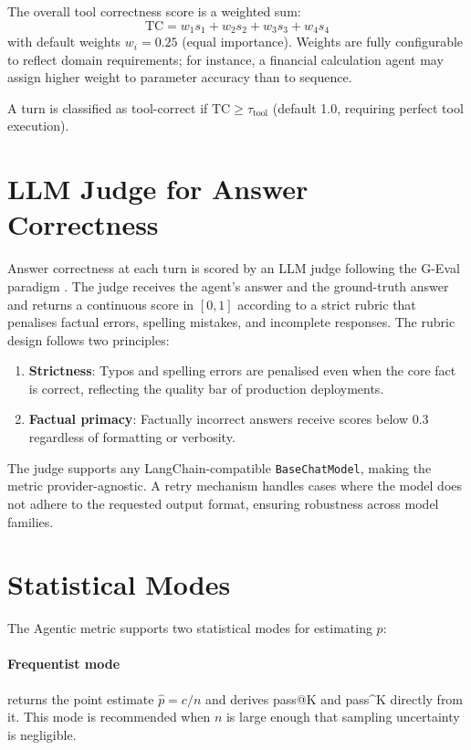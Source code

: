 \documentclass[11pt,a4paper]{article}
\begin{document}
The overall tool correctness score is a weighted sum:
\[
    \text{TC} = w_1 s_1 + w_2 s_2 + w_3 s_3 + w_4 s_4
\]
with default weights $w_i = 0.25$ (equal importance). Weights are fully
configurable to reflect domain requirements; for instance, a financial
calculation agent may assign higher weight to parameter accuracy than to
sequence.

A turn is classified as tool-correct if $\text{TC} \geq \tau_{\text{tool}}$
(default 1.0, requiring perfect tool execution).

\section{LLM Judge for Answer Correctness}
\label{sec:judge}

Answer correctness at each turn is scored by an LLM judge following the
G-Eval paradigm \citep{geval2023}. The judge receives the agent's answer and
the ground-truth answer and returns a continuous score in $[0,1]$ according to
a strict rubric that penalises factual errors, spelling mistakes, and
incomplete responses. The rubric design follows two principles:

\begin{enumerate}[leftmargin=*]
    \item \textbf{Strictness}: Typos and spelling errors are penalised even
    when the core fact is correct, reflecting the quality bar of production
    deployments.
    \item \textbf{Factual primacy}: Factually incorrect answers receive scores
    below 0.3 regardless of formatting or verbosity.
\end{enumerate}

The judge supports any LangChain-compatible \texttt{BaseChatModel}, making the
metric provider-agnostic. A retry mechanism handles cases where the model does
not adhere to the requested output format, ensuring robustness across model
families.

\section{Statistical Modes}

The Agentic metric supports two statistical modes for estimating $p$:

\paragraph{Frequentist mode} returns the point estimate $\hat{p} = c/n$ and
derives pass@K and pass\^{}K directly from it. This mode is recommended when
$n$ is large enough that sampling uncertainty is negligible.
\end{document}
